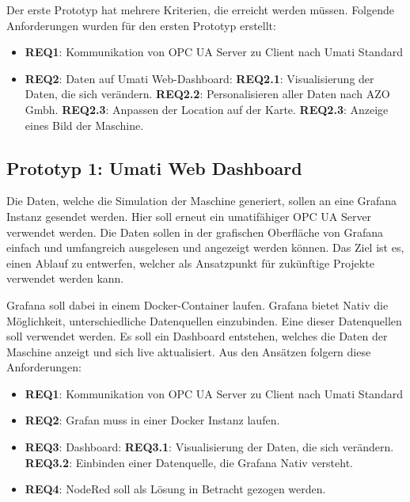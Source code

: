 \documentclass[a4paper, 12pt, oneside, toc=listofnumbered, bibliography=totoc]{scrbook}
\begin{document}
		Der erste Prototyp hat mehrere Kriterien, die erreicht werden müssen. Folgende Anforderungen wurden für den ersten Prototyp erstellt:
		
		\begin{itemize}
			\item \textbf{REQ1}: Kommunikation von OPC UA Server zu Client nach Umati Standard
			\item \textbf{REQ2}: Daten auf Umati Web-Dashboard:
			\subitem \textbf{REQ2.1}: Visualisierung der Daten, die sich verändern.
			\subitem \textbf{REQ2.2}: Personalisieren aller Daten nach AZO Gmbh.
			\subitem \textbf{REQ2.3}: Anpassen der Location auf der Karte.
			\subitem \textbf{REQ2.3}: Anzeige eines Bild der Maschine.
		\end{itemize}
		
		\subsection{Prototyp 1: Umati Web Dashboard}
		
		Die Daten, welche die Simulation der Maschine generiert, sollen an eine Grafana Instanz gesendet werden. Hier soll erneut ein umatifähiger OPC UA Server verwendet werden. Die Daten sollen in der grafischen Oberfläche von Grafana einfach und umfangreich ausgelesen und angezeigt werden können. Das Ziel ist es, einen Ablauf zu entwerfen, welcher als Ansatzpunkt für zukünftige Projekte verwendet werden kann. 
		
		Grafana soll dabei in einem Docker-Container laufen. Grafana bietet Nativ die Möglichkeit, unterschiedliche Datenquellen einzubinden. Eine dieser Datenquellen soll verwendet werden. Es soll ein Dashboard entstehen, welches die Daten der Maschine anzeigt und sich live aktualisiert. Aus den Ansätzen folgern diese Anforderungen:
		
		\begin{itemize}
			\item \textbf{REQ1}: Kommunikation von OPC UA Server zu Client nach Umati Standard
			\item \textbf{REQ2}: Grafan muss in einer Docker Instanz laufen.
			\item \textbf{REQ3}: Dashboard:
			\subitem \textbf{REQ3.1}: Visualisierung der Daten, die sich verändern.
			\subitem \textbf{REQ3.2}: Einbinden einer Datenquelle, die Grafana Nativ versteht.
			\item \textbf{REQ4}: NodeRed soll als Lösung in Betracht gezogen werden.
		\end{itemize}			
		
\end{document}
